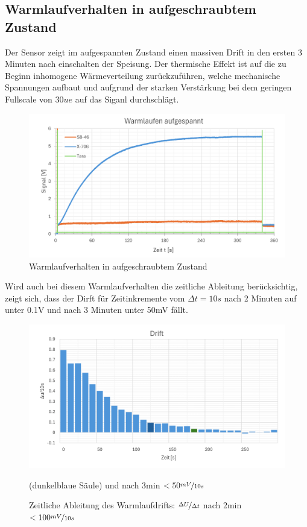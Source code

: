 \documentclass[12pt,a4paper]{article}
\begin{document}
	\subsection{Warmlaufverhalten in aufgeschraubtem Zustand}
	Der Sensor zeigt im aufgespannten Zustand einen massiven Drift in den ersten 3 Minuten nach einschalten der Speisung. Der thermische Effekt ist auf die zu Beginn inhomogene Wärmeverteilung zurückzuführen, welche mechanische Spannungen aufbaut und aufgrund der starken Verstärkung bei dem geringen Fullscale von $30ue$ auf das Siganl durchschlägt.
	\begin{figure}[H]
		\centering
		\includegraphics[width=1\linewidth]{Imgs/Warmlaufen_aufgespanntpng}
		\caption{Warmlaufverhalten in aufgeschraubtem Zustand}
		\label{fig:warmlaufenaufgespanntpng}
	\end{figure}\noindent
	Wird auch bei diesem Warmlaufverhalten die zeitliche Ableitung berücksichtig, zeigt sich, dass der Dirft für Zeitinkremente vom $\Delta t = 10s$ nach 2 Minuten auf unter 0.1V und nach 3 Minuten unter 50mV fällt. 
	\begin{figure}[H]
		\centering
		\includegraphics[width=1\linewidth]{Imgs/Warmlaufdrift_aufgespanntpng}
		\caption{Zeitliche Ableitung des Warmlaufdrifts: $\nicefrac{\Delta U}{\Delta t}$ nach 2min $<100\nicefrac{mV}{10s}$} (dunkelblaue Säule) und nach 3min $<50\nicefrac{mV}{10s}$
		\label{fig:warmlaufdriftaufgespanntpng}
	\end{figure}
\end{document}

